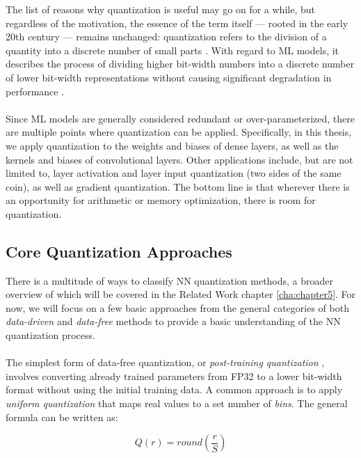 The list of reasons why quantization is useful may go on for a while, but regardless of the motivation,
the essence of the term itself — rooted in the early 20th century — remains unchanged:
quantization refers to the division of a quantity into a discrete number
of small parts \cite{gray1998quantization}. With regard to ML models, 
it describes the process of dividing higher bit-width numbers into a discrete number of lower bit-width representations
without causing significant degradation in performance \cite{gholami2021survey}.
\\
\\
Since ML models are generally considered redundant or over-parameterized,
there are multiple points where quantization can be applied.
Specifically, in this thesis, we apply quantization to the weights and biases of dense layers, 
as well as the kernels and biases of convolutional layers. 
Other applications include, but are not limited to, layer activation and layer input quantization (two sides of the same coin),
as well as gradient quantization. The bottom line is that wherever there is an opportunity for arithmetic or memory optimization,
there is room for quantization.


\subsection{Core Quantization Approaches}
\label{subsec:commonquantizationapproaches}

There is a multitude of ways to classify NN quantization methods, a broader overview of which will be covered
in the Related Work chapter \ref{cha:chapter5}.
For now, we will focus on a few basic approaches from the general categories of both 
\textit{data-driven} and \textit{data-free} methods \cite{Edouard2022SPIQ} to provide a basic understanding of the NN quantization process.
\\
\\
The simplest form of data-free quantization, or \textit{post-training quantization} \cite{jiang2021efficient},
involves converting already trained parameters from FP32 to a lower bit-width format
without using the initial training data. 
A common approach is to apply \textit{uniform quantization} that maps real values to a set number
of \textit{bins}. The general formula can be written as:

\[
Q(r) = round(\frac{r}{S})
\]

